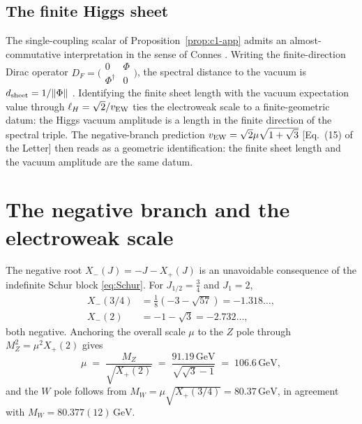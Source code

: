 \documentclass[aps,prd,onecolumn,superscriptaddress,nofootinbib,reprint]{revtex4-2}
\newcommand{\Xp}{X_{+}}
\newcommand{\Xm}{X_{-}}
\begin{document}
\subsection{The finite Higgs sheet}

The single-coupling scalar of Proposition~\ref{prop:c1-app} admits an
almost-commutative interpretation in the sense of Connes
\cite{ConnesLott1990,ChamseddineConnes2012}.  Writing the
finite-direction Dirac operator
$D_{F}=\bigl(\begin{smallmatrix}0&\Phi\\\Phi^{\dagger}&0\end{smallmatrix}\bigr)$,
the spectral distance to the vacuum is
$d_{\rm sheet}=1/\|\Phi\|$ \cite{MartinettiWulkenhaar2002}.  Identifying
the finite sheet length with the vacuum expectation value through
$\ell_{H}=\sqrt 2/v_{\rm EW}$ ties the electroweak scale to a
finite-geometric datum: the Higgs vacuum amplitude is a length in the
finite direction of the spectral triple.  The negative-branch
prediction $v_{\rm EW}=\sqrt{2}\mu\sqrt{1+\sqrt 3}$ [Eq.~(15) of the
Letter] then reads as a geometric identification: the finite sheet
length and the vacuum amplitude are the same datum.

\section{The negative branch and the electroweak scale}
\label{app:negative}

The negative root $\Xm(J)=-J-\Xp(J)$ is an unavoidable consequence of
the indefinite Schur block \eqref{eq:Schur}.  For $J_{1/2}=\tfrac34$
and $J_{1}=2$,
\begin{align}
  \Xm(3/4) &= \tfrac18(-3-\sqrt{57}) = -1.318\dots,\\
  \Xm(2) &= -1-\sqrt 3 = -2.732\dots,
\end{align}
both negative.  Anchoring the overall scale $\mu$ to the $Z$ pole
through $M_{Z}^{2}=\mu^{2}\Xp(2)$ gives
\begin{equation}
  \mu\;=\;\frac{M_{Z}}{\sqrt{\Xp(2)}}
  \;=\;\frac{91.19\,\text{GeV}}{\sqrt{\sqrt 3-1}}
  \;=\;106.6\,\text{GeV},
\label{eq:mu}
\end{equation}
and the $W$ pole follows from $M_{W}=\mu\sqrt{\Xp(3/4)}=80.37\,\text{GeV}$,
in agreement with $M_{W}=80.377(12)\,\text{GeV}$.
\end{document}
